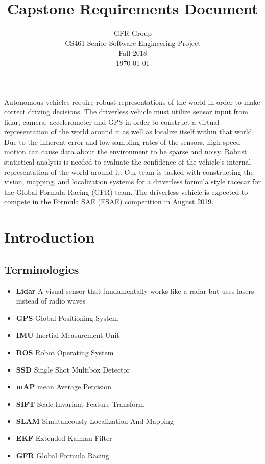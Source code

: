 \documentclass[10pt, onecolumn, draftclsnofoot, letterpaper,compsoc]{IEEEtran}
\title{Capstone Requirements Document}
\author{GFR Group \\
            CS461 Senior Software Engineering Project \\
            Fall 2018 \\
            \today}
\begin{document}
\maketitle

Autonomous vehicles require robust representations of the world in order to make correct driving decisions. The driverless vehicle must utilize sensor input from lidar, camera, accelerometer and GPS in order to construct a virtual representation of the world around it as well as localize itself within that world. Due to the inherent error and low sampling rates of the sensors, high speed motion can cause data about the environment to be sparse and noisy. Robust statistical analysis is needed to evaluate the confidence of the vehicle's internal representation of the world around it. Our team is tasked with constructing the vision, mapping, and localization systems for a driverless formula style racecar for the Global Formula Racing (GFR) team. The driverless vehicle is expected to compete in the Formula SAE (FSAE) competition in August 2019. 


\newpage
\tableofcontents
\newpage

\section{Introduction}

\subsection{Terminologies}

\begin{itemize}
    \item \textbf{Lidar} A visual sensor that fundamentally works like a radar but uses lasers instead of radio waves
    \item \textbf{GPS} Global Positioning System
    \item \textbf{IMU} Inertial Measurement Unit
    \item \textbf{ROS} Robot Operating System
    \item \textbf{SSD} Single Shot Multibox Detector
    \item \textbf{mAP} mean Average Percision
    \item \textbf{SIFT} Scale Invariant Feature Transform
    \item \textbf{SLAM} Simutaneously Localization And Mapping 
    \item \textbf{EKF} Extended Kalman Filter
    \item \textbf{GFR} Global Formula Racing
\end{itemize}
\end{document}
